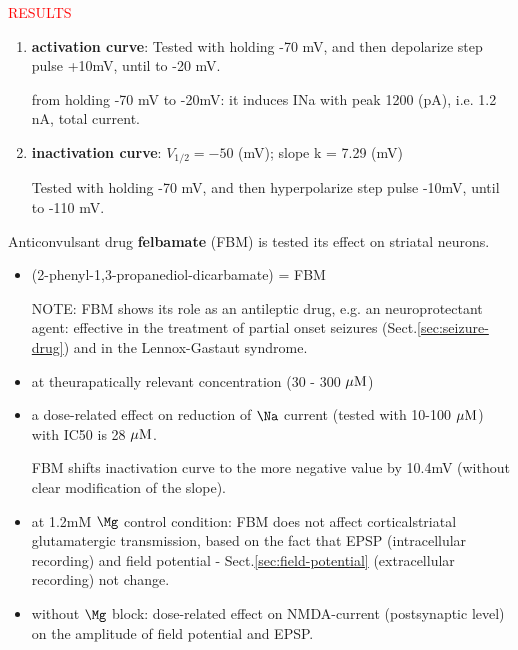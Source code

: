 \textcolor{red}{RESULTS}
\begin{enumerate}
   \item {\bf activation curve}:  
%   
Tested with holding -70 mV, and then depolarize step pulse +10mV, until to -20
mV.
    
%   
 
  from holding -70 mV to -20mV: it induces INa with peak 1200 (pA), i.e.
  1.2 nA, total current. 
   
  \item {\bf inactivation curve}: $V_{1/2} = -50$ (mV); slope k = 7.29 (mV)
  
  Tested with holding -70 mV, and then hyperpolarize step pulse -10mV, until to
  -110 mV.
  
  
\end{enumerate}


Anticonvulsant drug {\bf felbamate} (FBM) is tested its
effect on striatal neurons.
\begin{itemize}
  
  \item (2-phenyl-1,3-propanediol-dicarbamate) = FBM

NOTE: FBM shows its role as an antileptic drug, e.g. an neuroprotectant
agent:  effective in the treatment of partial onset seizures
(Sect.\ref{sec:seizure-drug}) and in the Lennox-Gastaut syndrome.
  
  \item at theurapatically relevant concentration (30 - 300 ${\mu\text{M}}$)
  
  \item a dose-related effect on reduction of $\Na$ current (tested with 10-100
  ${\mu\text{M}}$) with IC50 is 28 ${\mu\text{M}}$.
  
  FBM shifts inactivation curve to the more negative value by 10.4mV (without
  clear modification of the slope).
  
  \item at 1.2mM $\Mg$ control condition: FBM does not affect corticalstriatal
  glutamatergic transmission, based on the fact that EPSP (intracellular
  recording) and field potential - Sect.\ref{sec:field-potential} (extracellular
  recording) not change.
  
  \item without $\Mg$ block: dose-related effect on NMDA-current (postsynaptic
  level) on the amplitude of field potential and EPSP.
  
\end{itemize}



